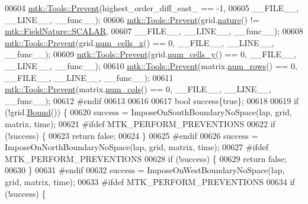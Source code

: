 \begin{DoxyCode}
00604   \hyperlink{classmtk_1_1Tools_a332324c6f25e66be9dff48c5987a3b9f}{mtk::Tools::Prevent}(highest\_order\_diff\_east\_ == -1,
00605                       \_\_FILE\_\_, \_\_LINE\_\_, \_\_func\_\_);
00606   \hyperlink{classmtk_1_1Tools_a332324c6f25e66be9dff48c5987a3b9f}{mtk::Tools::Prevent}(grid.\hyperlink{classmtk_1_1UniStgGrid2D_a99a3a9cdb05b7306be99bde935509e30}{nature}() != 
      \hyperlink{namespacemtk_ga4c54f2a329cfb4e56213b02a259d19e2a8f3d9a4b6a7b7f2c7afa61ca113d0db9}{mtk::FieldNature::SCALAR},
00607                       \_\_FILE\_\_, \_\_LINE\_\_, \_\_func\_\_);
00608   \hyperlink{classmtk_1_1Tools_a332324c6f25e66be9dff48c5987a3b9f}{mtk::Tools::Prevent}(grid.\hyperlink{classmtk_1_1UniStgGrid2D_a2d182866a398aba8e4829590e85bf939}{num\_cells\_x}() == 0, \_\_FILE\_\_, \_\_LINE\_\_, \_\_func\_\_);
00609   \hyperlink{classmtk_1_1Tools_a332324c6f25e66be9dff48c5987a3b9f}{mtk::Tools::Prevent}(grid.\hyperlink{classmtk_1_1UniStgGrid2D_aed05a801cc9a76dba0ff203cea58a61a}{num\_cells\_y}() == 0, \_\_FILE\_\_, \_\_LINE\_\_, \_\_func\_\_);
00610   \hyperlink{classmtk_1_1Tools_a332324c6f25e66be9dff48c5987a3b9f}{mtk::Tools::Prevent}(matrix.\hyperlink{classmtk_1_1DenseMatrix_a53f3afb3b6a8d21854458aaa9663cc74}{num\_rows}() == 0, \_\_FILE\_\_, \_\_LINE\_\_, \_\_func\_\_);
00611   \hyperlink{classmtk_1_1Tools_a332324c6f25e66be9dff48c5987a3b9f}{mtk::Tools::Prevent}(matrix.\hyperlink{classmtk_1_1DenseMatrix_a41747502d468c6728a4be31501b16e0e}{num\_cols}() == 0, \_\_FILE\_\_, \_\_LINE\_\_, \_\_func\_\_);
00612 \textcolor{preprocessor}{  #endif}
00613 
00616 
00617   \textcolor{keywordtype}{bool} success\{\textcolor{keyword}{true}\};
00618 
00619   \textcolor{keywordflow}{if} (!grid.\hyperlink{classmtk_1_1UniStgGrid2D_aa651194ccd0321a7c61a8f56fa5e8455}{Bound}()) \{
00620     success = ImposeOnSouthBoundaryNoSpace(lap, grid, matrix, time);
00621 \textcolor{preprocessor}{    #ifdef MTK\_PERFORM\_PREVENTIONS}
00622     \textcolor{keywordflow}{if} (!success) \{
00623       \textcolor{keywordflow}{return} \textcolor{keyword}{false};
00624     \}
00625 \textcolor{preprocessor}{    #endif}
00626     success = ImposeOnNorthBoundaryNoSpace(lap, grid, matrix, time);
00627 \textcolor{preprocessor}{    #ifdef MTK\_PERFORM\_PREVENTIONS}
00628     \textcolor{keywordflow}{if} (!success) \{
00629       \textcolor{keywordflow}{return} \textcolor{keyword}{false};
00630     \}
00631 \textcolor{preprocessor}{    #endif}
00632     success = ImposeOnWestBoundaryNoSpace(lap, grid, matrix, time);
00633 \textcolor{preprocessor}{    #ifdef MTK\_PERFORM\_PREVENTIONS}
00634     \textcolor{keywordflow}{if} (!success) \{

\end{DoxyCode}
